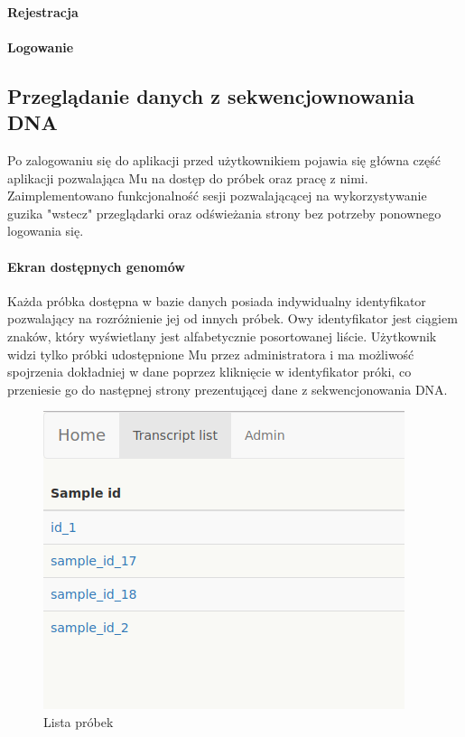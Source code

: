 \documentclass[a4paper,12pt,twoside]{article}
\begin{document}
  \paragraph{Rejestracja}
  \paragraph{Logowanie}
  
\subsection{Przeglądanie danych z sekwencjownowania DNA}
Po zalogowaniu się do aplikacji przed użytkownikiem pojawia się główna część aplikacji pozwalająca Mu 
na dostęp do próbek oraz pracę z nimi. Zaimplementowano funkcjonalność sesji pozwalającącej na 
wykorzystywanie guzika "wstecz" przeglądarki oraz odświeżania strony bez potrzeby ponownego
logowania się.
 
\newpage
\paragraph{Ekran dostępnych genomów}
Każda próbka dostępna w bazie danych posiada indywidualny identyfikator pozwalający na 
rozróżnienie jej od innych próbek. Owy identyfikator jest ciągiem znaków, który wyświetlany jest 
alfabetycznie posortowanej liście. Użytkownik widzi tylko próbki udostępnione Mu przez administratora
i ma możliwość spojrzenia dokładniej w dane poprzez kliknięcie w identyfikator próki,
co przeniesie go do następnej strony prezentującej dane z sekwencjonowania DNA. 
\newline
 
\begin{figure}[h!]
  \includegraphics[width=\linewidth]{obrazy/aplikacja/sample_list.png}
  \caption{Lista próbek}
  \label{fig:sample_listpic}
\end{figure}
\end{document}
